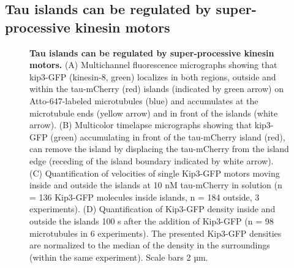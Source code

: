 \subsection{Tau islands can be regulated by super-processive kinesin motors}
\begin{figure}[h!tb]
\centering
\caption[Tau islands can be regulated by super-processive kinesin motors.]{
\textbf{Tau islands can be regulated by super-processive kinesin motors.} (A) Multichannel fluorescence micrographs showing that kip3-GFP (kinesin-8, green) localizes in both regions, outside and within the tau-mCherry (red) islands (indicated by green arrow) on Atto-647-labeled microtubules (blue) and accumulates at the microtubule ends (yellow arrow) and in front of the islands (white arrow). (B) Multicolor timelapse micrographs showing that kip3-GFP (green) accumulating in front of the tau-mCherry island (red), can remove the island by displacing the tau-mCherry from the island edge (receding of the island boundary indicated by white arrow). (C) Quantification of velocities of single Kip3-GFP motors moving inside and outside the islands at 10 nM tau-mCherry in solution (n = 136 Kip3-GFP molecules inside islands, n = 184 outside, 3 experiments). (D) Quantification of Kip3-GFP density inside and outside the islands 100 s after the addition of Kip3-GFP (n = 98 microtubules in 6 experiments). The presented Kip3-GFP densities are normalized to the median of the density in the surroundings (within the same experiment).  Scale bars 2 µm.  
	}\label{tau4}
\end{figure}

